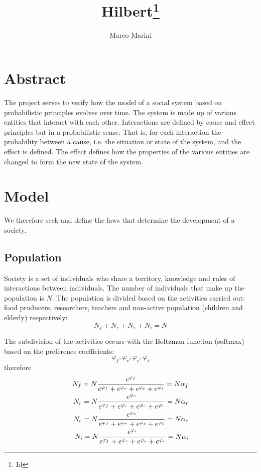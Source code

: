 \documentclass[a4paper,twoside]{article}
\begin{document}
\title{Hilbert\thanks{ $ $Id$ $}}
\author{Marco Marini}
\maketitle
\tableofcontents
\pagebreak

\section{Abstract}

The project serves to verify how the model of a social system based on probabilistic principles evolves over time.
The system is made up of various entities that interact with each other.
Interactions are defined by cause and effect principles but in a probabilistic sense.
That is, for each interaction the probability between a cause, i.e. the situation or state of the system, and the effect is defined.
The effect defines how the properties of the various entities are changed to form the new state of the system.

\section{Model}

We therefore seek and define the laws that determine the development of a society.

\subsection{Population}

Society is a set of individuals who share a territory, knowledge and rules of interactions between individuals.
The number of individuals that make up the population is $N$.
The population is divided based on the activities carried out: food producers, researchers, teachers and non-active population (children and elderly) respectively:
\begin{equation*}
	N_f + N_r + N_e + N_i = N
\end{equation*}

The subdivision of the activities occurs with the Boltzman function (softmax) based on the preference coefficients:
\begin{equation*}
	\varphi_f, \varphi_r, \varphi_e, \varphi_i
\end{equation*}
therefore
\begin{eqnarray}{\label{eq:pop}}
	N_f = N \frac{e^{\varphi_f}}{e^{\varphi_f}+e^{\varphi_r}+e^{\varphi_e}+e^{\varphi_i}} = N \alpha_f
\\
	N_r = N \frac{e^{\varphi_r}}{e^{\varphi_f}+e^{\varphi_r}+e^{\varphi_e}+e^{\varphi_i}} = N \alpha_r
\\
	N_e = N \frac{e^{\varphi_e}}{e^{\varphi_f}+e^{\varphi_r}+e^{\varphi_e}+e^{\varphi_i}} = N \alpha_e
\\
	N_i = N \frac{e^{\varphi_i}}{e^{\varphi_f}+e^{\varphi_r}+e^{\varphi_e}+e^{\varphi_i}} = N \alpha_i
\end{eqnarray}
\end{document}

